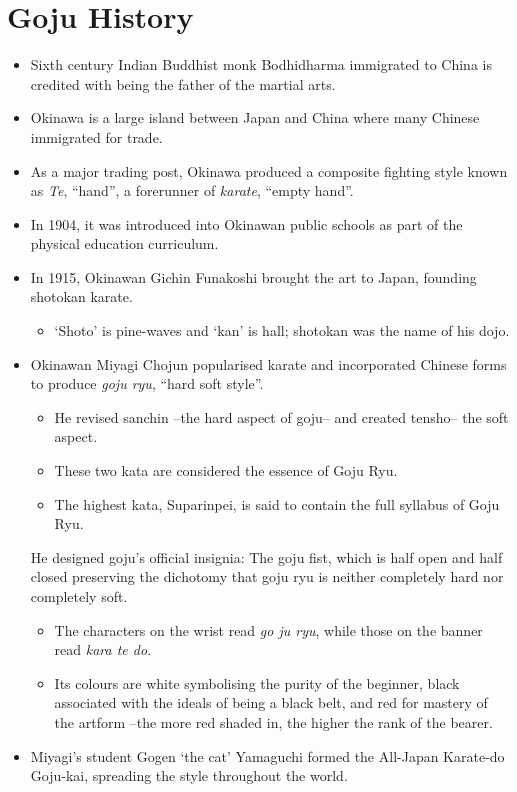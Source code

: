 \documentclass[11pt]{article}
\begin{document}
\section{Goju History}
\label{sec:org9d1b9df}

\begin{itemize}
\item Sixth century Indian Buddhist monk Bodhidharma immigrated to China is credited with being the father of the martial arts.
\item Okinawa is a large island between Japan and China where many Chinese immigrated for trade.
\item As a major trading post, Okinawa produced a composite fighting style known as \emph{Te}, “hand”, a forerunner of \emph{karate}, “empty hand”.
\item In 1904, it was introduced into Okinawan public schools as part of the physical education curriculum.
\item In 1915, Okinawan Gichin Funakoshi brought the art to Japan, founding shotokan karate.
\begin{itemize}
\item ‘Shoto’ is pine-waves and ‘kan’ is hall; shotokan was the name of his dojo.
\end{itemize}
\item Okinawan Miyagi Chojun popularised karate and incorporated Chinese forms to produce \emph{goju ryu}, “hard soft style”.
\begin{itemize}
\item He revised sanchin –the hard aspect of goju– and created tensho– the soft aspect.
\item These two kata are considered the essence of Goju Ryu.
\item The highest kata, Suparinpei, is said to contain the full syllabus of Goju Ryu.
\end{itemize}

He designed goju's official insignia: The goju fist, which is half open and half closed preserving the
dichotomy that goju ryu is neither completely hard nor completely soft.
\begin{itemize}
\item The characters on the wrist read \emph{go ju ryu}, while those on the banner read \emph{kara te do}.
\item Its colours are white symbolising the purity of the beginner, black associated with the ideals of being
a black belt, and red for mastery of the artform –the more red shaded in, the higher the rank of the bearer.
\end{itemize}

\item Miyagi's student Gogen ‘the cat’ Yamaguchi formed the All-Japan Karate-do Goju-kai, spreading the style throughout the world.
\end{itemize}
\end{document}
